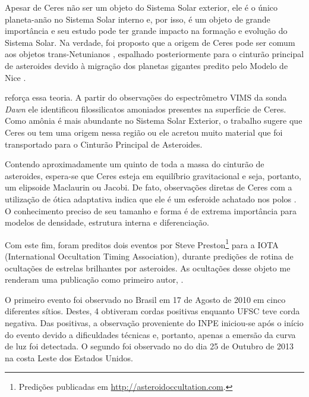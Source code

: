 \documentclass[12pt,a4paper]{report}
\begin{document}
\indent \indent Apesar de Ceres não ser um objeto do Sistema Solar exterior, ele é o único planeta-anão no Sistema Solar interno e, por isso, é um objeto de grande importância e seu estudo pode ter grande impacto na formação e evolução do Sistema Solar. Na verdade, foi proposto que a origem de Ceres pode ser comum aos objetos trans-Netunianos \citep{McKinnon2012}, espalhado posteriormente para o cinturão principal de asteroides devido à migração dos planetas gigantes predito pelo Modelo de Nice \citep{Gomes2005}.

\cite{DeSanctis2015} reforça essa teoria. A partir do observações do espectrômetro VIMS da sonda \textit{Dawn} ele identificou filossilicatos amoniados presentes na superfície de Ceres. Como amônia é mais abundante no Sistema Solar Exterior, o trabalho sugere que Ceres ou tem uma origem nessa região ou ele acretou muito material que foi transportado para o Cinturão Principal de Asteroides.

Contendo aproximadamente um quinto de toda a massa do cinturão de asteroides, espera-se que Ceres esteja em equilíbrio gravitacional e seja, portanto, um elipsoide Maclaurin ou Jacobi. De fato, observações diretas de Ceres com a utilização de ótica adaptativa indica que ele é um esferoide achatado nos polos \citep{Drummond2014}. O conhecimento preciso de seu tamanho e forma é de extrema importância para modelos de densidade, estrutura interna e diferenciação.

Com este fim, foram preditos dois eventos por Steve Preston\footnote{Predições publicadas em \url{http://asteroidoccultation.com}.} para a IOTA (International Occultation Timing Association), durante predições de rotina de ocultações de estrelas brilhantes por asteroides. As ocultações desse objeto me renderam uma publicação como primeiro autor, \citep{GomesJunior2015-Ceres}.


O primeiro evento foi observado no Brasil em 17 de Agosto de 2010 em cinco diferentes sítios. Destes, 4 obtiveram cordas positivas enquanto UFSC teve corda negativa. Das positivas, a observação proveniente do INPE iniciou-se após o início do evento devido a dificuldades técnicas e, portanto, apenas a emersão da curva de luz foi detectada. O segundo foi observado no do dia 25 de Outubro de 2013 na costa Leste dos Estados Unidos.
\end{document}

